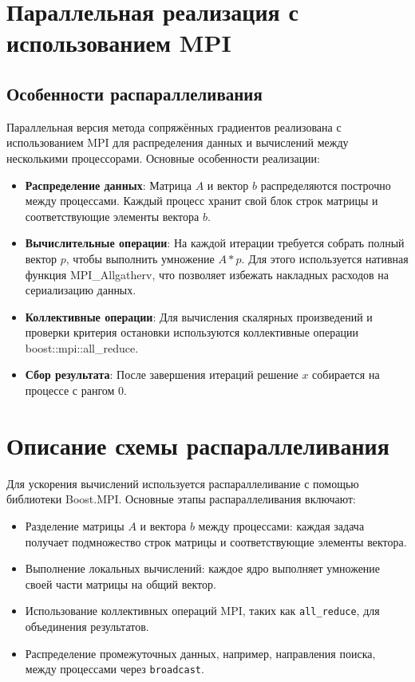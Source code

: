 \documentclass[12pt]{article}
\begin{document}
\section{Параллельная реализация с использованием MPI}
    
\subsection{Особенности распараллеливания}
Параллельная версия метода сопряжённых градиентов реализована с использованием MPI для распределения данных и вычислений между несколькими процессорами. Основные особенности реализации:
\begin{itemize}
    \item \textbf{Распределение данных}: Матрица $A$ и вектор $b$ распределяются построчно между процессами. Каждый процесс хранит свой блок строк матрицы и соответствующие элементы вектора $b$.
    \item \textbf{Вычислительные операции}: На каждой итерации требуется собрать полный вектор $p$, чтобы выполнить умножение $A*p$. Для этого используется нативная функция MPI\_Allgatherv, что позволяет избежать накладных расходов на сериализацию данных.
    \item \textbf{Коллективные операции}: Для вычисления скалярных произведений и проверки критерия остановки используются коллективные операции  boost::mpi::all\_reduce.
    \item \textbf{Сбор результата}: После завершения итераций решение $x$ собирается на процессе с рангом 0.
\end{itemize}
\section{Описание схемы распараллеливания}
Для ускорения вычислений используется распараллеливание с помощью библиотеки Boost.MPI. Основные этапы распараллеливания включают:
\begin{itemize}
    \item Разделение матрицы $A$ и вектора $b$ между процессами: каждая задача получает подмножество строк матрицы и соответствующие элементы вектора.
    \item Выполнение локальных вычислений: каждое ядро выполняет умножение своей части матрицы на общий вектор.
    \item Использование коллективных операций MPI, таких как \texttt{all\_reduce}, для объединения результатов.
    \item Распределение промежуточных данных, например, направления поиска, между процессами через \texttt{broadcast}.
\end{itemize}
\end{document}
